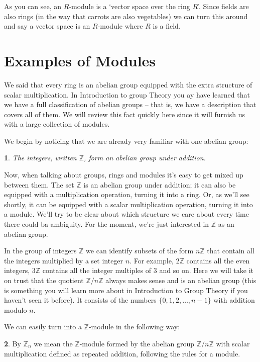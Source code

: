 \documentclass[oneside,english]{amsbook}
\numberwithin{section}{chapter}
\theoremstyle{plain}
\newtheorem{thm}{\protect\theoremname}
\theoremstyle{definition}
\newtheorem{defn}[thm]{\protect\definitionname}
\providecommand{\definitionname}{Definition}
\providecommand{\theoremname}{Theorem}
\begin{document}
			As you can see, an $R$-module is a `vector space over the ring $R$'. Since fields are also rings (in the way that carrots are also vegetables) we can turn this around and say a vector space is an $R$-module where $R$ is a field.

		\section{Examples of Modules}

			We said that every ring is an abelian group equipped with the extra structure of scalar multiplication. In Introduction to group Theory you ay have learned that we have a full classification of abelian groups -- that is, we have a description that covers all of them. We will review this fact quickly here since it will furnish us with a large collection of modules. 
			
			We begin by noticing that we are already very familiar with one abelian group:
			
			\begin{thm}
				The integers, written $\mathbb{Z}$, form an abelian group under addition.
			\end{thm}
			
			Now, when talking about groups, rings and modules it's easy to get mixed up between them. The set $\mathbb{Z}$ is an abelian group under addition; it can also be equipped with a multiplication operation, turning it into a ring. Or, as we'll see shortly, it can be equipped with a scalar multiplication operation, turning it into a module. We'll try to be clear about which structure we care about every time there could ba ambiguity. For the moment, we're just interested in $\mathbb{Z}$ as an abelian group.
			
			In the group of integers $\mathbb{Z}$ we can identify subsets of the form $n\mathbb{Z}$ that contain all the integers multiplied by a set integer $n$. For example, $2\mathbb{Z}$ contains all the even integers, $3\mathbb{Z}$ contains all the integer multiples of 3 and so on. Here we will take it on trust that the quotient $\mathbb{Z}/n\mathbb{Z}$ always makes sense and is an abelian group (this is something you will learn more about in Introduction to Group Theory if you haven't seen it before). It consists of the numbers $\{0, 1, 2, \ldots, n-1\}$ with addition modulo $n$.
			
			We can easily turn into a $\mathbb{Z}$-module in the following way:
			\begin{defn}
				By $\mathbb{Z}_n$ we mean the $\mathbb{Z}$-module formed by the abelian group $\mathbb{Z}/n\mathbb{Z}$ with scalar multiplication defined as repeated addition, following the rules for a module.
			\end{defn}
			
\end{document}
